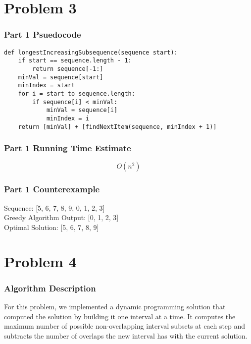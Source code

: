 \documentclass[letterpaper, 12pt]{math}
\begin{document}
\section*{Problem 3}

\subsubsection*{Part 1 Psuedocode}
\begin{lstlisting}
def longestIncreasingSubsequence(sequence start):
    if start == sequence.length - 1:
        return sequence[-1:]
    minVal = sequence[start]
    minIndex = start
    for i = start to sequence.length:
        if sequence[i] < minVal:
            minVal = sequence[i]
            minIndex = i
    return [minVal] + [findNextItem(sequence, minIndex + 1)]
\end{lstlisting}

\subsubsection*{Part 1 Running Time Estimate}
\[ O(n^2) \]

\subsubsection*{Part 1 Counterexample}
Sequence: [5, 6, 7, 8, 9, 0, 1, 2, 3] \\
Greedy Algorithm Output: [0, 1, 2, 3] \\
Optimal Solution: [5, 6, 7, 8, 9]

\section*{Problem 4}

\subsubsection*{Algorithm Description}
For this problem, we implemented a dynamic programming solution that computed
the solution by building it one interval at a time. It computes the maximum
number of possible non-overlapping interval subsets at each step and subtracts
the number of overlaps the new interval has with the current solution.
\end{document}
